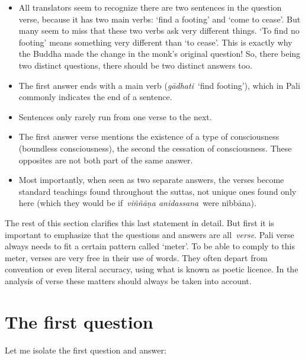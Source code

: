 \documentclass[10pt, openright]{book}
\begin{document}
\begin{itemize}

\itemsep5pt\parskip0pt


\item
All translators seem to recognize there are two sentences in the question verse, because it has two main verbs: ‘find a footing’ and ‘come to cease’. But many seem to miss that these two verbs ask very different things. ‘To find no footing’ means something very different than ‘to cease’. This is exactly why the Buddha made the change in the monk’s original question! So, there being two distinct questions, there should be two distinct answers too.



\item
The first answer ends with a main verb (\textit{gādhati} ‘find footing’), which in Pali commonly indicates the end of a sentence.



\item
Sentences only rarely run from one verse to the next.



\item
The first answer verse mentions the existence of a type of consciousness (boundless consciousness), the second the cessation of consciousness. These opposites are not both part of the same answer.



\item
Most importantly, when seen as two separate answers, the verses become standard teachings found throughout the suttas, not unique ones found only here (which they would be if \textit{viññāṇa anidassana} were nibbāna).





\end{itemize}
The rest of this section clarifies this last statement in detail. But first it is important to emphasize that the questions and answers are all \textit{verse}. Pali verse always needs to fit a certain pattern called ‘meter’. To be able to comply to this meter, verses are very free in their use of words. They often depart from convention or even literal accuracy, using what is known as poetic licence. In the analysis of verse these matters should always be taken into account.




\section{The first question}
Let me isolate the first question and answer:
\end{document}
